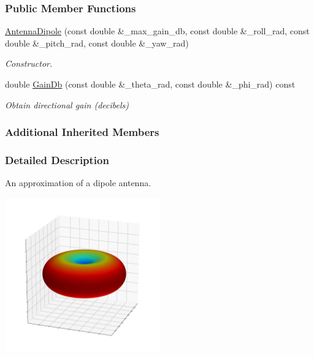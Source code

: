 \subsubsection*{Public Member Functions}
\begin{DoxyCompactItemize}
\item 
\hyperlink{classosse_1_1collaborate_1_1_antenna_dipole_ab3146ec94f0d032743c5277d1f56b3d2}{Antenna\+Dipole} (const double \&\+\_\+max\+\_\+gain\+\_\+db, const double \&\+\_\+roll\+\_\+rad, const double \&\+\_\+pitch\+\_\+rad, const double \&\+\_\+yaw\+\_\+rad)
\begin{DoxyCompactList}\small\item\em Constructor. \end{DoxyCompactList}\item 
double \hyperlink{classosse_1_1collaborate_1_1_antenna_dipole_a46aab376eb3bb44ae47beceef79db8df}{Gain\+Db} (const double \&\+\_\+theta\+\_\+rad, const double \&\+\_\+phi\+\_\+rad) const
\begin{DoxyCompactList}\small\item\em Obtain directional gain (decibels) \end{DoxyCompactList}\end{DoxyCompactItemize}
\subsubsection*{Additional Inherited Members}


\subsubsection{Detailed Description}
An approximation of a dipole antenna. 

 
\begin{DoxyImageNoCaption}
  \mbox{\includegraphics[width=0.5\textwidth]{dipole}}
\end{DoxyImageNoCaption}


